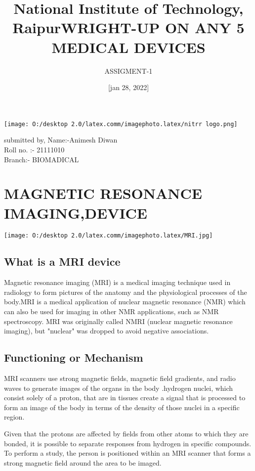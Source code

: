 \documentclass[12pt]{article}
\title{National Institute of Technology, Raipur}
\author{ASSIGMENT-1}
\date{[jan 28, 2022]}
\begin{document}
\maketitle
\centering
\title{WRIGHT-UP ON ANY 5 MEDICAL DEVICES}


\texttt{[image: O:/desktop 2.0/latex.comm/imagephoto.latex/nitrr logo.png]}
\centering

submitted by,
Name:-Animesh Diwan\\
Roll no. :- 21111010\\
Branch:- BIOMADICAL\\
\newpage


\tableofcontents

 

\section{MAGNETIC RESONANCE IMAGING,DEVICE}
\texttt{[image: O:/desktop 2.0/latex.comm/imagephoto.latex/MRI.jpg]}

 

\subsection{What is a MRI device}

Magnetic resonance imaging (MRI) is a medical imaging technique used in radiology to form pictures of the anatomy and the physiological processes of the body.MRI is a medical application of nuclear magnetic resonance (NMR) which can also be used for imaging in other NMR applications, such as NMR spectroscopy. MRI was originally called NMRI (nuclear magnetic resonance imaging), but "nuclear" was dropped to avoid negative associations.


\subsection{Functioning or Mechanism}

 MRI scanners use strong magnetic fields, magnetic field gradients, and radio waves to generate images of the organs in the body .hydrogen nuclei, which consist solely of a proton, that are in tissues create a signal that is processed to form an image of the body in terms of the density of those nuclei in a specific region. 
 
 Given that the protons are affected by fields from other atoms to which they are bonded, it is possible to separate responses from hydrogen in specific compounds. To perform a study, the person is positioned within an MRI scanner that forms a strong magnetic field around the area to be imaged.
\end{document}
